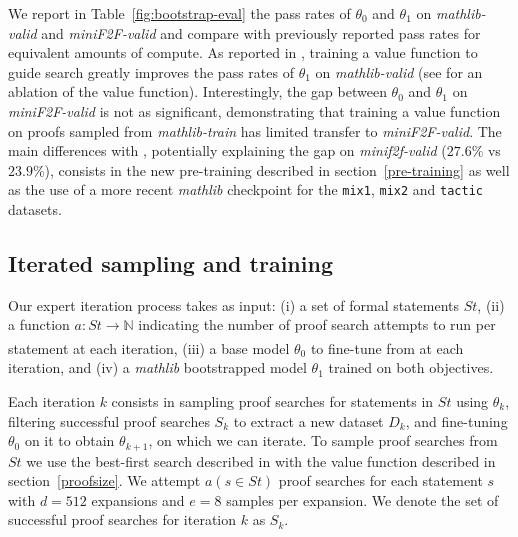\documentclass[nohyperref]{article}
\theoremstyle{plain}
\theoremstyle{definition}
\theoremstyle{remark}
\begin{document}
We report in Table~\ref{fig:bootstrap-eval} the pass rates of $\theta_0$ and $\theta_1$ on \textit{mathlib-valid} and \textit{miniF2F-valid} and compare with previously reported pass rates for equivalent amounts of compute. As reported in \citet{polu2020generative}, training a value function to guide search greatly improves the pass rates of $\theta_1$ on \textit{mathlib-valid} (see \citet{polu2020generative} for an ablation of the value function). Interestingly, the gap between $\theta_0$ and $\theta_1$ on \textit{miniF2F-valid} is not as significant, demonstrating that training a value function on proofs sampled from \textit{mathlib-train} has limited transfer to \textit{miniF2F-valid}. The main differences with \citet{zheng2021minif2f}, potentially explaining the gap on \textit{minif2f-valid} ($27.6\%$ vs $23.9\%$), consists in the new pre-training described in section~\ref{pre-training} as well as the use of a more recent \textit{mathlib} checkpoint for the \texttt{mix1}, \texttt{mix2} and \texttt{tactic} datasets.


\subsection{Iterated sampling and training}

Our expert iteration process takes as input: (i) a set of formal statements $\mathit{St}$, (ii) a function $a: \mathit{St} \xrightarrow[]{} \mathbb{N}$ indicating the number of proof search attempts to run per statement at each iteration, (iii) a base model $\theta_0$ to fine-tune from at each iteration, and (iv) a \textit{mathlib} bootstrapped model $\theta_1$ trained on both objectives.

Each iteration $k$ consists in sampling proof searches for statements in $\mathit{St}$ using $\theta_k$, filtering successful proof searches $S_k$ to extract a new dataset $D_k$, and fine-tuning $\theta_0$ on it to obtain $\theta_{k+1}$, on which we can iterate. To sample proof searches from $St$ we use the best-first search described in \citet{polu2020generative} with the value function described in section~\ref{proofsize}. We attempt $a(s \in St)$ proof searches for each statement $s$ with $d=512$ expansions and $e=8$ samples per expansion. We denote the set of successful proof searches for iteration $k$ as $S_k$. 
\end{document}
